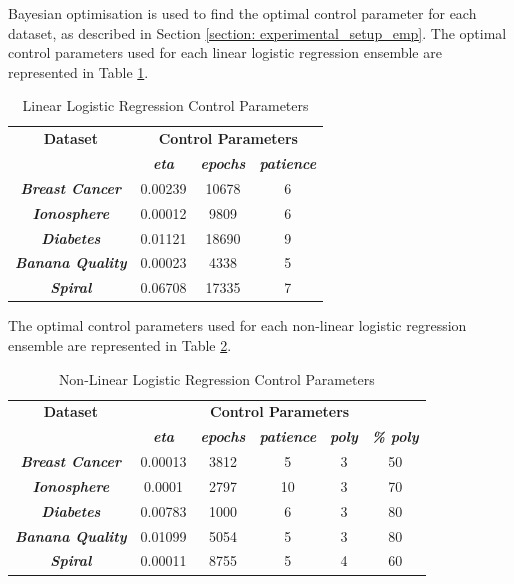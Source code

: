 \documentclass[10pt, conference]{IEEEtran}
\begin{document}
Bayesian optimisation is used to find the optimal control parameter for each dataset,
as described in Section \ref{section: experimental_setup_emp}.
The optimal control parameters used for each linear logistic regression ensemble are represented
in Table \ref{table: LR_control_parameters}.
\begin{table}[h!]
    \caption{Linear Logistic Regression Control Parameters}
    \begin{center}
        \begin{tabular}{|c||c|c|c|}
            \hline
            \textbf{Dataset}&\multicolumn{3}{|c|}{\textbf{Control Parameters}} \\
            \cline{2-4}
                        & \textbf{\textit{eta}} & \textbf{\textit{epochs}} & \textbf{\textit{patience}}\\
            \hline
            \textbf{\textit{Breast Cancer}} & 0.00239 & 10678 & 6 \\
            \textbf{\textit{Ionosphere}} & 0.00012 & 9809 & 6\\
            \textbf{\textit{Diabetes}} & 0.01121 & 18690 & 9\\
            \textbf{\textit{Banana Quality}}  & 0.00023 & 4338 & 5 \\
            \textbf{\textit{Spiral}} & 0.06708 & 17335 & 7\\
            \hline
        \end{tabular}
    \end{center}
    \label{table: LR_control_parameters}
\end{table}

The optimal control parameters used for each non-linear logistic regression ensemble are represented
in Table \ref{table: NLR_control_parameters}.
\begin{table}[h!]
    \caption{Non-Linear Logistic Regression Control Parameters}
    \begin{center}
        \begin{tabular}{|c||c|c|c|c|c|}
            \hline
            \textbf{Dataset}&\multicolumn{5}{|c|}{\textbf{Control Parameters}} \\
            \cline{2-6}
                        & \textbf{\textit{eta}} & \textbf{\textit{epochs}} & \textbf{\textit{patience}} & \textbf{\textit{poly}} & \textbf{\textit{\% poly}}\\
            \hline
            \textbf{\textit{Breast Cancer}} & 0.00013 & 3812 & 5 & 3 & 50\\
            \textbf{\textit{Ionosphere}} & 0.0001 & 2797 & 10 & 3 & 70\\
            \textbf{\textit{Diabetes}} & 0.00783 & 1000 & 6 & 3 & 80\\
            \textbf{\textit{Banana Quality}} & 0.01099 & 5054 & 5 & 3 & 80\\
            \textbf{\textit{Spiral}} & 0.00011 & 8755 & 5 & 4 & 60\\
            \hline
        \end{tabular}
    \end{center}
    \label{table: NLR_control_parameters}
\end{table}
\end{document}
